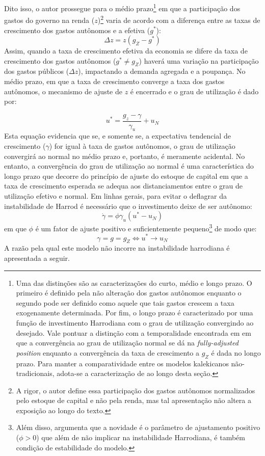Dito isso, o autor prossegue para o médio prazo\footnote{
	Uma das distinções \textcite{allain_tackling_2015} são as caracterizações do curto, médio e longo prazo. O primeiro é definido pela não alteração dos gastos autônomos enquanto o segundo pode ser definido como aquele que tais gastos crescem a taxa exogenamente determinada. Por fim, o longo prazo é caracterizado por uma função de investimento Harrodiana com o grau de utilização convergindo ao desejado. Vale pontuar a distinção com a temporalidade encontrada em \textcite{freitas_growth_2015} em que a convergência ao grau de utilização normal se dá na \textit{fully-adjusted position} enquanto a convergência da taxa de crescimento a $g_Z$ é dada no longo prazo. Para manter a comparatividade entre os modelos kalekicanos não-tradicionais, adota-se a caracterização de \textcite{allain_tackling_2015} ao longo desta seção.
} em que a participação dos gastos do governo na renda ($z$)\footnote{A rigor, o autor define essa participação dos gastos autônomos normalizados pelo estoque de capital e não pela renda, mas tal apresentação não altera a exposição ao longo do texto.} varia de acordo com a diferença entre as taxas de crescimento dos gastos autônomos e a efetiva ($g^*$):
\begin{equation}
    \Delta z = z (g_Z - g^*)
\end{equation}
Assim, quando a taxa de crescimento efetiva da economia se difere da taxa de crescimento dos gastos autônomos ($g^*\neq g_Z$)  haverá uma variação na participação dos gastos públicos ($\Delta z$), impactando a demanda agregada e a poupança. No médio prazo, em que a taxa de crescimento converge a taxa dos gastos autônomos, o mecanismo de ajuste de $z$ é encerrado e o grau de utilização é dado por:

\begin{equation}
u^* = \frac{g_z - \gamma}{\gamma_u} + u_N
\end{equation}
Esta equação evidencia que se, e somente se, a expectativa tendencial de crescimento ($\gamma$) for igual à taxa de gastos autônomos, o grau de utilização convergirá ao normal no médio prazo e, portanto, é meramente acidental. No entanto, a convergência do grau de utilização ao normal é uma característica do longo prazo que decorre do princípio de ajuste do estoque de capital em que a taxa de crescimento esperada se adequa aos distanciamentos entre o grau de utilização efetivo e normal. Em linhas gerais, para evitar o deflagrar da instabilidade de Harrod é necessário que o investimento deixe de ser autônomo: 
\begin{equation}
\label{eqAllain}
    \dot \gamma = \phi\gamma_u(u^* - u_N)
\end{equation}
em que $\phi$ é um fator de ajuste positivo e suficientemente pequeno\footnote{
	Além disso, \textcite[p.~14]{allain_tackling_2015} argumenta que a novidade  é o parâmetro  de ajustamento positivo ($\phi > 0$) que além de não implicar na instabilidade Harrodiana, é também condição de estabilidade do modelo.
} de modo que:
$$
\gamma = g = g_Z \Leftrightarrow u^* \to u_N
$$
A razão pela qual este modelo não incorre na instabilidade harrodiana é apresentada a seguir.

